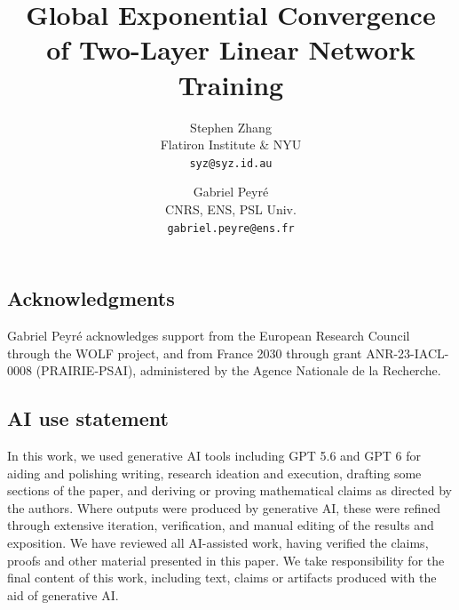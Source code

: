 \documentclass[11pt]{article}
\title{Global Exponential Convergence\\of Two-Layer Linear Network Training}
\author{Stephen Zhang\\
  {\normalsize Flatiron Institute \& NYU}\\
  {\small\texttt{syz@syz.id.au}}
  \and
  Gabriel Peyr\'e\\
  {\normalsize CNRS, ENS, PSL Univ.}\\
  {\small\texttt{gabriel.peyre@ens.fr}}}
\date{}
\begin{document}
\maketitle

\begin{abstract}

\end{abstract}








\FloatBarrier


\subsection*{Acknowledgments}
Gabriel Peyr\'e acknowledges support from the European Research Council through
the WOLF project, and from France 2030 through grant ANR-23-IACL-0008
(PRAIRIE-PSAI), administered by the Agence Nationale de la Recherche.

\subsection*{AI use statement}
In this work, we used generative AI tools including GPT 5.6 and GPT 6 for aiding and polishing writing, research ideation and execution, drafting some sections of the paper, and deriving or proving mathematical claims as directed by the authors. Where outputs were produced by generative AI, these were refined through extensive iteration, verification, and manual editing of the results and exposition. 
We have reviewed all AI-assisted work, having verified the claims, proofs and other material presented in this paper.
We take responsibility for the final content of this work, including text, claims or artifacts produced with the aid of generative AI.

\newpage 


\appendix





\clearpage

\clearpage

\end{document}
